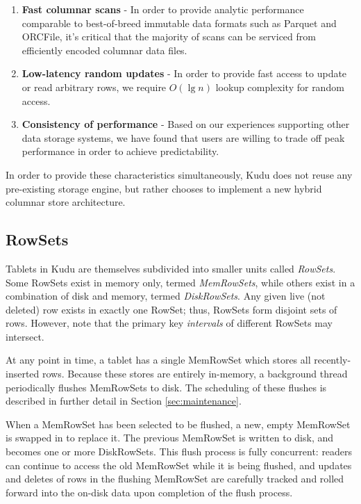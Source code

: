 \documentclass{vldb}
\begin{document}
\begin{enumerate}
\item {\bf Fast columnar scans} - In order to provide analytic performance comparable to
  best-of-breed immutable data formats such as Parquet and ORCFile\cite{orcfile}, it's critical
  that the majority of scans can be serviced from efficiently encoded columnar data files.
\item {\bf Low-latency random updates} - In order to provide fast access to update or read
  arbitrary rows, we require $O(\lg n)$ lookup complexity for random access.
\item {\bf Consistency of performance} - Based on our experiences supporting other
  data storage systems, we have found that users are willing to trade off peak performance
  in order to achieve predictability.
\end{enumerate}

In order to provide these characteristics simultaneously, Kudu does not reuse any
pre-existing storage engine, but rather chooses to implement a new hybrid columnar store
architecture.

\subsection{RowSets}

Tablets in Kudu are themselves subdivided into smaller units called {\em RowSets}.
Some RowSets exist in memory only, termed {\em MemRowSets}, while others
exist in a combination of disk and memory, termed {\em DiskRowSets}. Any given
live (not deleted) row exists in exactly one RowSet; thus, RowSets form disjoint
sets of rows. However, note that the primary key {\em intervals} of different RowSets
may intersect.

At any point in time, a tablet has a single MemRowSet which stores all recently-inserted
rows. Because these stores are entirely in-memory, a background thread periodically
flushes MemRowSets to disk. The scheduling of these flushes is described in further
detail in Section \ref{sec:maintenance}.

When a MemRowSet has been selected to be flushed, a new, empty MemRowSet is swapped in to
replace it. The previous MemRowSet is written to disk, and becomes one or more DiskRowSets.  This flush
process is fully concurrent: readers can continue to access the old MemRowSet while it is being
flushed, and updates and deletes of rows in the flushing MemRowSet are carefully tracked and rolled
forward into the on-disk data upon completion of the flush process.
\end{document}
